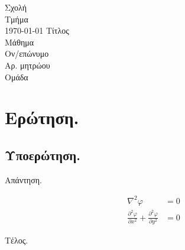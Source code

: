 \documentclass[11pt,a4paper]{article}
\providecommand*{\pd}[3][]{\frac{\partial^{#1}#2}{\partial #3^{#1}}}
\begin{document}
\renewcommand{\thesubsection}{{}(\alph{subsection})}

\renewcommand{\textdexiakeraia}{}

\addto\captionsgreek{
    \renewcommand{\figurename}{Διάγραμμα}
    \renewcommand{\bibname}{Βιβλιογραφία}
    \renewcommand{\refname}{Βιβλιογραφία}
}

\begin{titlepage}
\centering
\large
Σχολή \\
Τμήμα \\
\today
\vfill
\vfill
{\huge Τίτλος \\}
{\LARGE Μάθημα \\}
\vfill
\large
Ον/επώνυμο \\
Αρ. μητρώου \\
Ομάδα
\vfill
\vfill
\end{titlepage}


\section{Ερώτηση.}

\subsection{Υποερώτηση.}

Απάντηση.

\begin{align*}
    \displaystyle %
    \nabla^2\varphi                         &= 0 \\
    \pd[2]{\varphi}{x} + \pd[2]{\varphi}{y} &= 0
\end{align*}

Τέλος.


%
%
%
\end{document}
